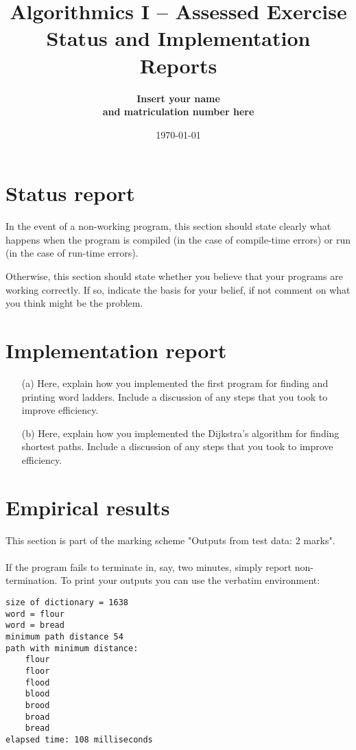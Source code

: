 \documentclass[11pt]{article}
\title{Algorithmics I --  Assessed Exercise\\ \vspace{4mm} 
Status and Implementation Reports}
\author{\bf Insert your name\\ \bf and matriculation number here}
\date{\today}
\begin{document}
\maketitle

\section*{Status report}

In the event of a non-working program, this section should state clearly what happens when the program is compiled (in the case of compile-time errors) or run (in the case of run-time errors).  

Otherwise, this section should state whether you believe that your programs are working correctly. If so, indicate the basis for your belief, if not comment on what you think might be the problem.

\section*{Implementation report}

\begin{itemize}
\item[(a)] 
Here, explain how you implemented the first program for finding and printing word ladders. Include a discussion of any steps that you took to improve efficiency.
\item[(b)]
Here, explain how you implemented the Dijkstra's algorithm for finding shortest paths. Include a discussion of any steps that you took to improve efficiency.
\end{itemize}

\section*{Empirical results}

This section is part of the marking scheme "Outputs from test data: 2 marks".
\\ \\
If the program fails to terminate in, say, two minutes, simply report non-termination. To print your outputs you can use the verbatim environment:

\begin{verbatim}
size of dictionary = 1638
word = flour
word = bread
minimum path distance 54
path with minimum distance:
    flour
    floor
    flood
    blood
    brood
    broad
    bread
elapsed time: 108 milliseconds
\end{verbatim}
\end{document}
